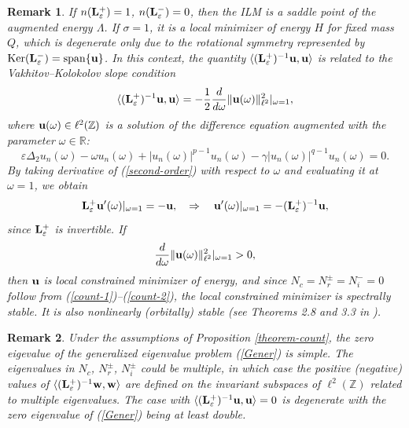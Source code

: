 \documentclass[12pt,reqno]{amsart}
\newtheorem{remark}{Remark}
\begin{document}
\begin{remark}
	If $n({\bf L}_{\varepsilon}^+) = 1$, $n({\bf L}_{\varepsilon}^-) = 0$, 
	then the ILM is a saddle point of the augmented energy $\Lambda$. 
	If $\sigma = 1$, it is a local minimizer of energy $H$ for fixed mass $Q$, which is degenerate only due to the rotational symmetry represented by ${\rm Ker}({\bf L}^-_{\varepsilon}) = {\rm span}\{{\bf u}\}$. In this context, the quantity $\langle ({\bf L}_{\varepsilon}^+)^{-1} {\bf u}, {\bf u} \rangle$ is related to the Vakhitov--Kolokolov slope condition 
	\begin{equation*}
	\langle ({\bf L}_{\varepsilon}^+)^{-1} {\bf u}, {\bf u} \rangle = - \frac{1}{2}\frac{d}{d\omega} \| {\bf u}(\omega) \|^2_{\ell^2} |_{\omega = 1},
	\end{equation*}
	where ${\bf u}(\omega) \in \ell^2(\mathbb{Z})$ is a solution of the difference equation augmented with the parameter $\omega \in \mathbb{R}$: 
	\begin{equation}
	\varepsilon \Delta_2 u_n(\omega) - \omega u_n(\omega) + |u_n(\omega) |^{p-1} u_n(\omega) - \gamma |u_n(\omega)|^{q-1} u_n(\omega) = 0.
	\label{second-order}
	\end{equation}
	By taking derivative of (\ref{second-order}) with respect to $\omega$ and evaluating it at $\omega = 1$, we obtain 
	\begin{equation*}
	{\bf L}_{\varepsilon}^+ {\bf u}'(\omega) |_{\omega = 1} = -{\bf u}, \quad \Rightarrow \quad {\bf u}'(\omega) |_{\omega = 1} = -  ({\bf L}_{\varepsilon}^+)^{-1} {\bf u},
	\end{equation*}
since ${\bf L}_{\varepsilon}^+$ is invertible. If 
$$
\frac{d}{d\omega} \| {\bf u}(\omega) \|^2_{\ell^2} |_{\omega = 1} > 0,
$$ 
then ${\bf u}$ is  local constrained minimizer of energy, and since $N_c = N_r^{\pm} = N_i^- = 0$ follow from (\ref{count-1})--(\ref{count-2}), the local constrained minimizer is spectrally stable. It is also nonlinearly (orbitally) stable (see Theorems 2.8 and 3.3 in \cite{GP25}).
\end{remark}

\begin{remark}
	Under the assumptions of Proposition \ref{theorem-count}, the zero 
	eigevalue of the generalized eigenvalue problem (\ref{Gener}) is simple. 
	The eigenvalues in $N_c$, $N_r^{\pm}$, $N_i^{\pm}$ could be multiple, in which case the positive (negative) values of $\langle ({\bf L}_{\varepsilon}^+)^{-1} {\bf w}, {\bf w} \rangle$ are defined on the invariant subspaces of $\ell^2(\mathbb{Z})$ related to multiple eigenvalues. 
	The case with $\langle ({\bf L}_{\varepsilon}^+)^{-1} {\bf u}, {\bf u} \rangle = 0$ is degenerate with the zero eigenvalue of (\ref{Gener}) being at least double. 
\end{remark}
\end{document}
